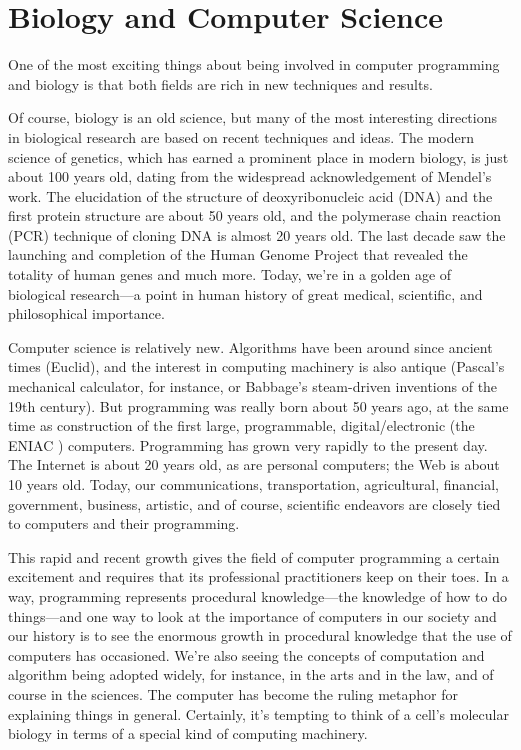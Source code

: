 \chapter{Biology and Computer Science}
\label{chap:chapter1}
\minitoc

One of the most exciting things about being involved in computer programming and biology is that both fields are rich in new techniques and results.

Of course, biology is an old science, but many of the most interesting directions in biological research are based on recent techniques and ideas. The modern science of genetics, which has earned a prominent place in modern biology, is just about 100 years old, dating from the widespread acknowledgement of Mendel's work. The elucidation of the structure of deoxyribonucleic acid (DNA) and the first protein structure are about 50 years old, and the polymerase chain reaction (PCR) technique of cloning DNA is almost 20 years old. The last decade saw the launching and completion of the Human Genome Project that revealed the totality of human genes and much more. Today, we're in a golden age of biological research—a point in human history of great medical, scientific, and philosophical importance.

Computer science is relatively new. Algorithms have been around since ancient times (Euclid), and the interest in computing machinery is also antique (Pascal's mechanical calculator, for instance, or Babbage's steam-driven inventions of the 19th century). But programming was really born about 50 years ago, at the same time as construction of the first large, programmable, digital/electronic (the ENIAC ) computers.  Programming has grown very rapidly to the present day. The Internet is about 20 years old, as are personal computers; the Web is about 10 years old. Today, our communications, transportation, agricultural, financial, government, business, artistic, and of course, scientific endeavors are closely tied to computers and their programming.

This rapid and recent growth gives the field of computer programming a certain excitement and requires that its professional practitioners keep on their toes. In a way, programming represents procedural knowledge—the knowledge of how to do things—and one way to look at the importance of computers in our society and our history is to see the enormous growth in procedural knowledge that the use of computers has occasioned. We're also seeing the concepts of computation and algorithm being adopted widely, for instance, in the arts and in the law, and of course in the sciences. The computer has become the ruling metaphor for explaining things in general. Certainly, it's tempting to think of a cell's molecular biology in terms of a special kind of computing machinery.

